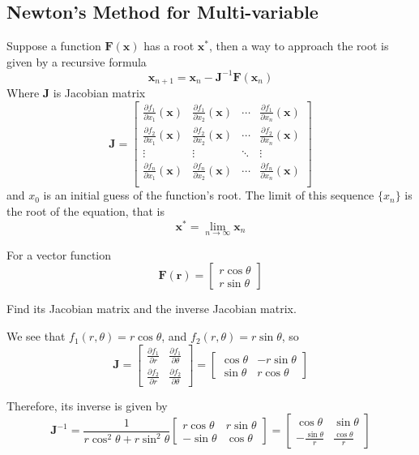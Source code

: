\subsection*{Newton's Method for Multi-variable}
\begin{thm}
	Suppose a function $\mathbf{F}(\mathbf{x})$ has a root $\mathbf{x^*}$, then a way to approach the root is given by a recursive formula
	\[ \mathbf{x}_{n+1} = \mathbf{x}_n - \mathbf{J}^{-1}\mathbf{F}(\mathbf{x}_n) \]
	Where $\mathbf{J}$ is Jacobian matrix 
	\[ \mathbf{J} = \begin{bmatrix}
	\frac{\partial f_1}{\partial x_1}(\mathbf{x})& \frac{\partial f_1}{\partial x_2}(\mathbf{x}) & \cdots & \frac{\partial f_1}{\partial x_n}(\mathbf{x})\\
	\frac{\partial f_2}{\partial x_1}(\mathbf{x})& \frac{\partial f_2}{\partial x_2}(\mathbf{x}) & \cdots & \frac{\partial f_2}{\partial x_n}(\mathbf{x})\\
	\vdots & \vdots & \ddots & \vdots\\
	\frac{\partial f_n}{\partial x_1}(\mathbf{x})& \frac{\partial f_n}{\partial x_2}(\mathbf{x}) & \cdots & \frac{\partial f_n}{\partial x_n}(\mathbf{x})\\
	\end{bmatrix} \] 
	and $x_0$ is an initial guess of the function's root. The limit of this sequence $\{x_n\}$ is the root of the equation, that is 
	\[ \mathbf{x}^* = \lim_{n\to\infty} \mathbf{x}_n \]

\end{thm}

\begin{ex}
	For a vector function 
	\[ \mathbf{F}(\mathbf{r}) = \begin{bmatrix}
	r\cos\theta\\ r\sin\theta
	\end{bmatrix} \] 
	
	Find its Jacobian matrix and the inverse Jacobian matrix.
\end{ex}
\begin{solution}
	We see that $f_1(r,\theta) = r\cos\theta$, and $f_2(r,\theta) = r\sin\theta$, so
	\[ \mathbf{J} = \begin{bmatrix}
	\frac{\partial f_1}{\partial r} & \frac{\partial f_1}{\partial \theta}\\
	\frac{\partial f_2}{\partial r} & \frac{\partial f_2}{\partial \theta}
	\end{bmatrix}
	= \begin{bmatrix}
	\cos\theta & -r\sin\theta\\
	\sin\theta & r\cos\theta
	\end{bmatrix} \]
	
	Therefore, its inverse is given by
	\[ \mathbf{J}^{-1} = \frac{1}{r\cos^2\theta + r\sin^2\theta}
	\begin{bmatrix}
	r\cos\theta & r\sin\theta\\
	-\sin\theta & \cos\theta
	\end{bmatrix}
	= \begin{bmatrix}
	\cos\theta & \sin\theta\\
	-\frac{\sin\theta}{r} & \frac{\cos\theta}{r}
	\end{bmatrix}   \]
\end{solution}


